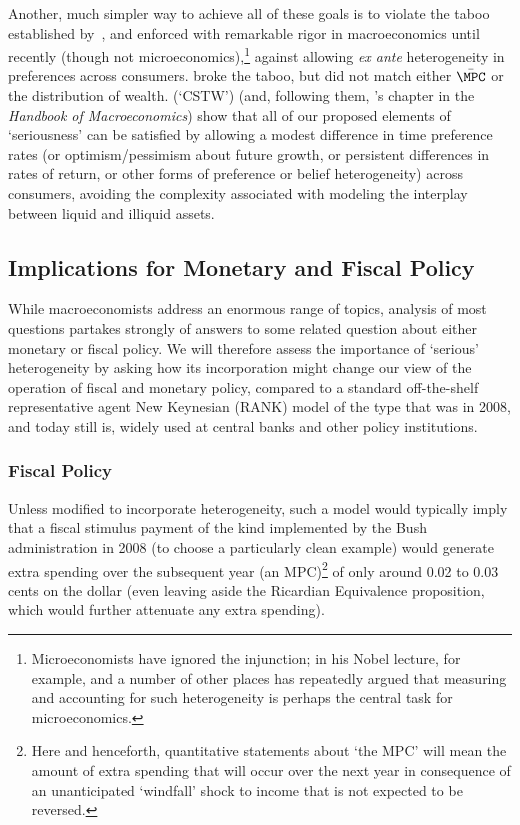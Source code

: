 \documentclass[titlepage]{econtex}
\begin{document}
Another, much simpler way to achieve all of these goals is to violate the taboo established by~\cite{bsDigustibus}, and enforced with remarkable rigor in macroeconomics  until recently (though not microeconomics),\footnote{Microeconomists have ignored the injunction; in his Nobel lecture, for example, and a number of other places \cite{HeckmanNobel} has repeatedly argued that measuring and accounting for such heterogeneity is perhaps the central task for microeconomics.} against allowing {\it ex ante} heterogeneity in preferences across consumers.  \cite{ksHetero} broke the taboo, but did not match either $\bar{\MPC}$ or the distribution of wealth.  \cite{cstwMPC} (`CSTW') (and, following them, \cite{kruegerMitmanPerri:handbookMacro}'s chapter in the {\it Handbook of Macroeconomics}) show that all of our proposed elements of `seriousness' can be satisfied by allowing a modest difference in time preference rates (or optimism/pessimism about future growth, or persistent differences in rates of return, or other forms of preference or belief heterogeneity) across consumers, avoiding the complexity associated with modeling the interplay between liquid and illiquid assets. 

\subsection{Implications for Monetary and Fiscal Policy}

While macroeconomists address an enormous range of topics, analysis of most questions partakes strongly of answers to some related question about either monetary or fiscal policy. We will therefore assess the importance of `serious' heterogeneity by asking how its incorporation might change our view of the operation of fiscal and monetary policy, compared to a standard off-the-shelf representative agent New Keynesian (RANK) model of the type that was in 2008, and today still is, widely used at central banks and other policy institutions.  

\subsubsection{Fiscal Policy}

Unless modified to incorporate heterogeneity, such a model would typically imply that a fiscal stimulus payment of the kind implemented by the Bush administration in 2008 (to choose a particularly clean example) would generate extra spending over the subsequent year (an MPC)\footnote{Here and henceforth, quantitative statements about `the MPC' will mean the amount of extra spending that will occur over the next year in consequence of an unanticipated `windfall' shock to income that is not expected to be reversed.}   of only around 0.02 to 0.03 cents on the dollar (even leaving aside the Ricardian Equivalence proposition, which would further attenuate any extra spending).
\end{document}
